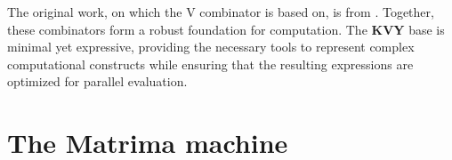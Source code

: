 \documentclass{IEEEtran}
\begin{document}

\par The original work, on which the V combinator is based on, is from \cite{ClK}. Together, these combinators form a robust foundation for computation. The \textbf{KVY} base is minimal yet expressive, providing the necessary tools to represent complex computational constructs while ensuring that the resulting expressions are optimized for parallel evaluation.

\section{The Matrima machine}
\end{document}
